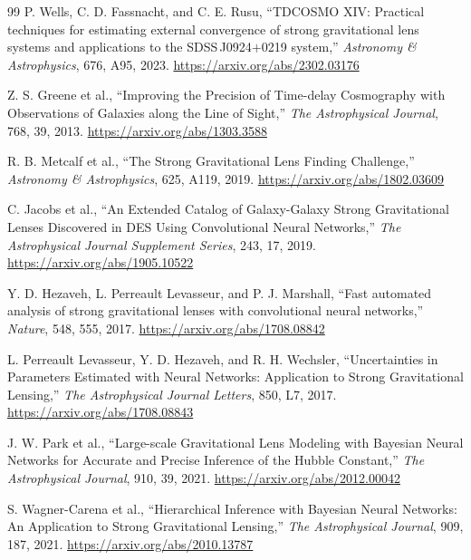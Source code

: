 \begin{thebibliography}{99}
P. Wells, C. D. Fassnacht, and C. E. Rusu,
``TDCOSMO XIV: Practical techniques for estimating external convergence of strong gravitational lens systems and applications to the SDSS\,J0924$+$0219 system,''
\emph{Astronomy \& Astrophysics}, 676, A95, 2023.
\url{https://arxiv.org/abs/2302.03176}

Z. S. Greene et al.,
``Improving the Precision of Time-delay Cosmography with Observations of Galaxies along the Line of Sight,''
\emph{The Astrophysical Journal}, 768, 39, 2013.
\url{https://arxiv.org/abs/1303.3588}

R. B. Metcalf et al.,
``The Strong Gravitational Lens Finding Challenge,''
\emph{Astronomy \& Astrophysics}, 625, A119, 2019.
\url{https://arxiv.org/abs/1802.03609}

C. Jacobs et al.,
``An Extended Catalog of Galaxy-Galaxy Strong Gravitational Lenses Discovered in DES Using Convolutional Neural Networks,''
\emph{The Astrophysical Journal Supplement Series}, 243, 17, 2019.
\url{https://arxiv.org/abs/1905.10522}

Y. D. Hezaveh, L. Perreault Levasseur, and P. J. Marshall,
``Fast automated analysis of strong gravitational lenses with convolutional neural networks,''
\emph{Nature}, 548, 555, 2017.
\url{https://arxiv.org/abs/1708.08842}

L. Perreault Levasseur, Y. D. Hezaveh, and R. H. Wechsler,
``Uncertainties in Parameters Estimated with Neural Networks: Application to Strong Gravitational Lensing,''
\emph{The Astrophysical Journal Letters}, 850, L7, 2017.
\url{https://arxiv.org/abs/1708.08843}

J. W. Park et al.,
``Large-scale Gravitational Lens Modeling with Bayesian Neural Networks for Accurate and Precise Inference of the Hubble Constant,''
\emph{The Astrophysical Journal}, 910, 39, 2021.
\url{https://arxiv.org/abs/2012.00042}

S. Wagner-Carena et al.,
``Hierarchical Inference with Bayesian Neural Networks: An Application to Strong Gravitational Lensing,''
\emph{The Astrophysical Journal}, 909, 187, 2021.
\url{https://arxiv.org/abs/2010.13787}


\end{thebibliography}
